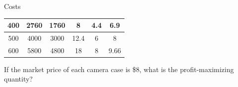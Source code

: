 \documentclass{beamer}
\begin{document}
\begin{frame}[t]{Costs}
\begin{table}[H]
\begin{tabular}{cccccc}
    400      & 2760                                                  & 1760                                                    & 8                                                        & 4.4                                                              & 6.9                                                           \\ \hline
    500      & 4000                                                  & 3000                                                    & 12.4                                                     & 6                                                                & 8                                                             \\ \hline
    600      & 5800                                                  & 4800                                                    & 18                                                       & 8                                                                & 9.66                                                         
    \end{tabular}
    \end{table}
    If the market price of each camera case is \$8, what is the profit-maximizing quantity?
\end{frame}
\end{document}
